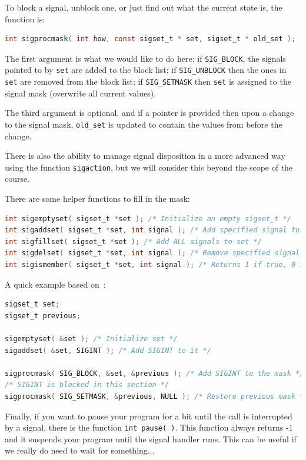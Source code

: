 To block a signal, unblock one, or just find out what the current state is, the function is:
\begin{lstlisting}[language=C]
int sigprocmask( int how, const sigset_t * set, sigset_t * old_set );
\end{lstlisting}

The first argument is what we would like to do here: if \texttt{SIG\_BLOCK}, the signals pointed to by \texttt{set} are added to the block list; if \texttt{SIG\_UNBLOCK} then the ones in \texttt{set} are removed from the block list; if \texttt{SIG\_SETMASK} then \texttt{set} is assigned to the signal mask (overwrite all current values)\cite{lpi}.

The third argument is optional, and if a pointer is provided then upon a change to the signal mask, \texttt{old\_set} is updated to contain the values from before the change.

There is also the ability to manage signal disposition in a more advanced way using the function \texttt{sigaction}, but we will consider this beyond the scope of the course.

There are some helper functions to fill in the mask:
\begin{lstlisting}[language=C]
int sigemptyset( sigset_t *set ); /* Initialize an empty sigset_t */
int sigaddset( sigset_t *set, int signal ); /* Add specified signal to set */
int sigfillset( sigset_t *set ); /* Add ALL signals to set */
int sigdelset( sigset_t *set, int signal ); /* Remove specified signal from set */
int sigismember( sigset_t *set, int signal ); /* Returns 1 if true, 0 if false */
\end{lstlisting}

A quick example based on~\cite{lpi}:
\begin{lstlisting}[language=C]
sigset_t set;
sigset_t previous;

sigemptyset( &set ); /* Initialize set */
sigaddset( &set, SIGINT ); /* Add SIGINT to it */

sigprocmask( SIG_BLOCK, &set, &previous ); /* Add SIGINT to the mask */
/* SIGINT is blocked in this section */
sigprocmask( SIG_SETMASK, &previous, NULL ); /* Restore previous mask */

\end{lstlisting}

Finally, if you want to pause your program for a bit until the call is interrupted by a signal, there is the function \texttt{int pause( )}. This function always returns -1 and it suspends your program until the signal handler runs. This can be useful if we really do need to wait for something...


